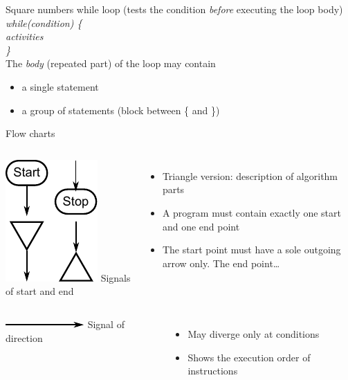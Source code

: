 \documentclass[usenames,dvipsnames,aspectratio=169]{beamer}
\newcommand{\kiemel}[1]{{\color{kiemelesszin}#1}}
\begin{document}
\begin{frame}{Square numbers}
  while loop (tests the condition \emph{before} executing the loop body)
  \vfill
  \emph{while(condition) \{} \\
  \hspace{0.5cm} \emph{activities}\\
  \emph{\}}\\
  \vfill
  The \emph{body} (repeated part) of the loop may contain
  \begin{itemize}
    \item a single statement
    \item a group of statements (block between \kiemel{\{} and \kiemel{\}})
  \end{itemize}
\end{frame}

\begin{frame}{Flow charts}
  \begin{columns}[T]
      \includegraphics{./startend.pdf}
      Signals of start and end
      \begin{itemize}
        \item Triangle version: description of algorithm parts
        \item A program must contain exactly one start and one end point
        \item The start point must have a sole outgoing arrow only. The end point\dots
      \end{itemize}
  \end{columns}
  \vfill
  \begin{columns}[T]
      \includegraphics{./direction.pdf}
      Signal of direction
      \begin{itemize}
        \item May diverge only at conditions
        \item Shows the execution order of instructions
      \end{itemize}
  \end{columns}
\end{frame}
\end{document}
